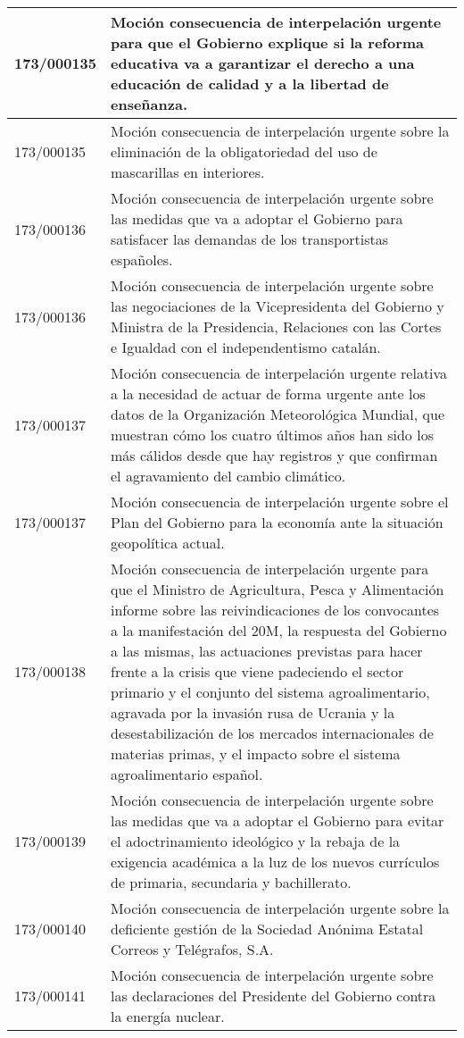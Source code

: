 {\begin{table}[H]
\begin{center}
\begin{tabularx}{\linewidth}{| l | X |}
\hline
173/000135 & Moción consecuencia de interpelación urgente para que el Gobierno explique si la reforma educativa va a garantizar el derecho a una educación de calidad y a la libertad de enseñanza. \\
\hline
173/000135 & Moción consecuencia de interpelación urgente sobre la eliminación de la obligatoriedad del uso de mascarillas en interiores. \\
\hline
173/000136 & Moción consecuencia de interpelación urgente sobre las medidas que va a adoptar el Gobierno para satisfacer las demandas de los transportistas españoles. \\
\hline
173/000136 & Moción consecuencia de interpelación urgente sobre las negociaciones de la Vicepresidenta del Gobierno y Ministra de la Presidencia, Relaciones con las Cortes e Igualdad con el independentismo catalán. \\
\hline
173/000137 & Moción consecuencia de interpelación urgente relativa a la necesidad de actuar de forma urgente ante los datos de la Organización Meteorológica Mundial, que muestran cómo los cuatro últimos años han sido los más cálidos desde que hay registros y que confirman el agravamiento del cambio climático. \\
\hline
173/000137 & Moción consecuencia de interpelación urgente sobre el Plan del Gobierno para la economía ante la situación geopolítica actual. \\
\hline
173/000138 & Moción consecuencia de interpelación urgente para que el Ministro de Agricultura, Pesca y Alimentación informe sobre las reivindicaciones de los convocantes a la manifestación del 20M, la respuesta del Gobierno a las mismas, las actuaciones previstas para hacer frente a la crisis que viene padeciendo el sector primario y el conjunto del sistema agroalimentario, agravada por la invasión rusa de Ucrania y la desestabilización de los mercados internacionales de materias primas, y el impacto sobre el sistema agroalimentario español. \\
\hline
173/000139 & Moción consecuencia de interpelación urgente sobre las medidas que va a adoptar el Gobierno para evitar el adoctrinamiento ideológico y la rebaja de la exigencia académica a la luz de los nuevos currículos de primaria, secundaria y bachillerato. \\
\hline
173/000140 & Moción consecuencia de interpelación urgente sobre la deficiente gestión de la Sociedad Anónima Estatal Correos y Telégrafos, S.A. \\
\hline
173/000141 & Moción consecuencia de interpelación urgente sobre las declaraciones del Presidente del Gobierno contra la energía nuclear. \\

\end{tabularx}
\end{center}
\end{table}}
